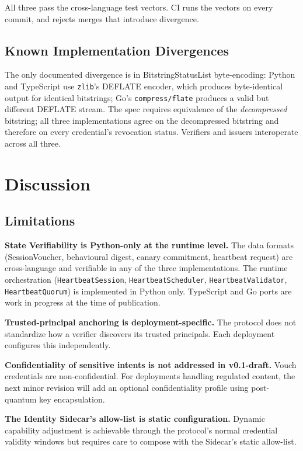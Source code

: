 \documentclass[11pt,a4paper,twocolumn]{article}
\begin{document}
All three pass the cross-language test vectors. CI runs the vectors on every commit, and rejects merges that introduce divergence.

\subsection{Known Implementation Divergences}

The only documented divergence is in BitstringStatusList byte-encoding: Python and TypeScript use \texttt{zlib}'s DEFLATE encoder, which produces byte-identical output for identical bitstrings; Go's \texttt{compress/flate} produces a valid but different DEFLATE stream. The spec requires equivalence of the \emph{decompressed} bitstring; all three implementations agree on the decompressed bitstring and therefore on every credential's revocation status. Verifiers and issuers interoperate across all three.

\section{Discussion}
\label{sec:discussion}

\subsection{Limitations}

\noindent\textbf{State Verifiability is Python-only at the runtime level.} The data formats (SessionVoucher, behavioural digest, canary commitment, heartbeat request) are cross-language and verifiable in any of the three implementations. The runtime orchestration (\verb|HeartbeatSession|, \verb|HeartbeatScheduler|, \verb|HeartbeatValidator|, \verb|HeartbeatQuorum|) is implemented in Python only. TypeScript and Go ports are work in progress at the time of publication.

\noindent\textbf{Trusted-principal anchoring is deployment-specific.} The protocol does not standardize how a verifier discovers its trusted principals. Each deployment configures this independently.

\noindent\textbf{Confidentiality of sensitive intents is not addressed in v0.1-draft.} Vouch credentials are non-confidential. For deployments handling regulated content, the next minor revision will add an optional confidentiality profile using post-quantum key encapsulation.

\noindent\textbf{The Identity Sidecar's allow-list is static configuration.} Dynamic capability adjustment is achievable through the protocol's normal credential validity windows but requires care to compose with the Sidecar's static allow-list.
\end{document}
